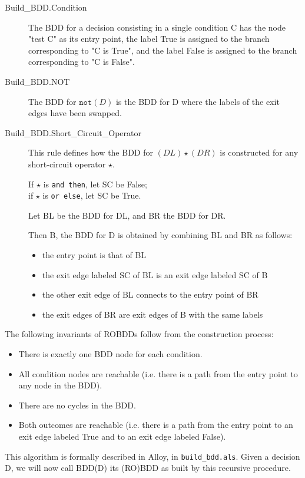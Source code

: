 \documentclass[a4paper,12pt,twoside]{article}
\newcommand{\anysc}{\star}
\newcommand{\andthen}{\texttt{and then}}
\newcommand{\orelse}{\texttt{or else}}
\newcommand{\adanot}{\texttt{not}}
\begin{document}
\begin{description}
\item[Build\_BDD.Condition]
  The BDD for a decision consisting in a single condition C has the node
  "test C" as its entry point, the label True is assigned to the branch
  corresponding to "C is True", and the label False is assigned to the
  branch corresponding to "C is False".

\item[Build\_BDD.NOT]
  The BDD for $\adanot{} (D)$ is the BDD for D where the labels of the exit
  edges have been swapped.

\item[Build\_BDD.Short\_Circuit\_Operator]
  This rule defines how the BDD for $(DL) \anysc{} (DR)$ is constructed for
  any short-circuit operator $\anysc{}$.

  If $\anysc{}$ is \andthen{}, let SC be False;\\
  if $\anysc{}$ is \orelse{}, let SC be True.

  Let BL be the BDD for DL, and BR the BDD for DR.

  Then B, the BDD for D is obtained by combining BL and BR as follows:
  \begin{itemize}
    \item the entry point is that of BL
    \item the exit edge labeled SC of BL is an exit edge labeled SC of B
    \item the other exit edge of BL connects to the entry point of BR
    \item the exit edges of BR are exit edges of B with the same labels
  \end{itemize}
\end{description}

The following invariants of ROBDDs follow from the construction process:
\begin{itemize}
  \item There is exactly one BDD node for each condition.
  \item All condition nodes are reachable (i.e. there is a path from
        the entry point to any node in the BDD).
  \item There are no cycles in the BDD.
  \item Both outcomes are reachable (i.e. there is a path from the entry point
        to an exit edge labeled True and to an exit edge labeled False).
\end{itemize}

This algorithm is formally described in Alloy, in \verb|build_bdd.als|.
Given a decision D, we will now call BDD(D) its (RO)BDD as built by this
recursive procedure.
\end{document}
